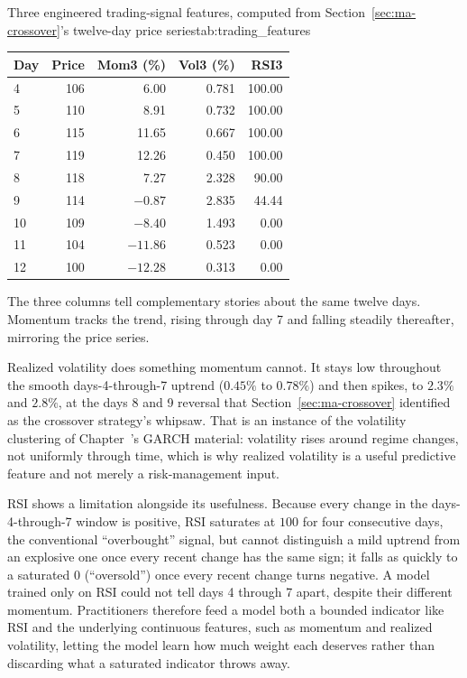 \documentclass[../ai_in_finance]{subfiles}
\begin{document}
\begin{booktable}[htbp]{Three engineered trading-signal features, computed from Section~\ref{sec:ma-crossover}'s twelve-day price series}{tab:trading_features}
\begin{tabular}{lrrrr}
\toprule
Day & Price & Mom3 (\%) & Vol3 (\%) & RSI3 \\
\midrule
4  & 106 & 6.00   & 0.781 & 100.00 \\
5  & 110 & 8.91   & 0.732 & 100.00 \\
6  & 115 & 11.65  & 0.667 & 100.00 \\
7  & 119 & 12.26  & 0.450 & 100.00 \\
8  & 118 & 7.27   & 2.328 & 90.00 \\
9  & 114 & $-0.87$  & 2.835 & 44.44 \\
10 & 109 & $-8.40$  & 1.493 & 0.00 \\
11 & 104 & $-11.86$ & 0.523 & 0.00 \\
12 & 100 & $-12.28$ & 0.313 & 0.00 \\
\bottomrule
\end{tabular}
\end{booktable}

The three columns tell complementary stories about the same twelve days. Momentum tracks the trend, rising through day 7 and falling steadily thereafter, mirroring the price series.

Realized volatility does something momentum cannot. It stays low throughout the smooth days-4-through-7 uptrend ($0.45\%$ to $0.78\%$) and then spikes, to $2.3\%$ and $2.8\%$, at the days 8 and 9 reversal that Section~\ref{sec:ma-crossover} identified as the crossover strategy's whipsaw. That is an instance of the volatility clustering of Chapter~'s GARCH material: volatility rises around regime changes, not uniformly through time, which is why realized volatility is a useful predictive feature and not merely a risk-management input.

RSI shows a limitation alongside its usefulness. Because every change in the days-4-through-7 window is positive, RSI saturates at $100$ for four consecutive days, the conventional ``overbought'' signal, but cannot distinguish a mild uptrend from an explosive one once every recent change has the same sign; it falls as quickly to a saturated $0$ (``oversold'') once every recent change turns negative. A model trained only on RSI could not tell days 4 through 7 apart, despite their different momentum. Practitioners therefore feed a model both a bounded indicator like RSI and the underlying continuous features, such as momentum and realized volatility, letting the model learn how much weight each deserves rather than discarding what a saturated indicator throws away.
\end{document}
